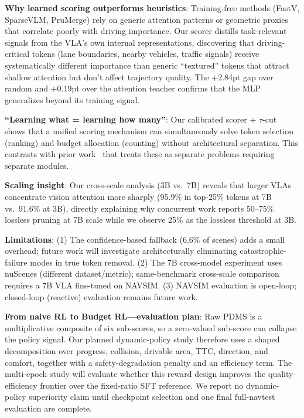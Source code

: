 \documentclass[letterpaper]{article} %
\begin{document}
\textbf{Why learned scoring outperforms heuristics}: Training-free methods (FastV, SparseVLM, PruMerge) rely on generic attention patterns or geometric proxies that correlate poorly with driving importance.
Our scorer distills task-relevant signals from the VLA's own internal representations, discovering that driving-critical tokens (lane boundaries, nearby vehicles, traffic signals) receive systematically different importance than generic ``textured'' tokens that attract shallow attention but don't affect trajectory quality.
The +2.84pt gap over random and +0.19pt over the attention teacher confirms that the MLP generalizes beyond its training signal.

\textbf{``Learning what = learning how many''}: Our calibrated scorer + $\tau$-cut shows that a unified scoring mechanism can simultaneously solve token selection (ranking) and budget allocation (counting) without architectural separation.
This contrasts with prior work~\citep{prune2drive2026,mvpruner2026} that treats these as separate problems requiring separate modules.

\textbf{Scaling insight}: Our cross-scale analysis (3B vs.\ 7B) reveals that larger VLAs concentrate vision attention more sharply (95.9\% in top-25\% tokens at 7B vs.\ 91.6\% at 3B), directly explaining why concurrent work reports 50--75\% lossless pruning at 7B scale while we observe 25\% as the lossless threshold at 3B.

\textbf{Limitations}:
(1) The confidence-based fallback (6.6\% of scenes) adds a small overhead; future work will investigate architecturally eliminating catastrophic-failure modes in true token removal.
(2) The 7B cross-model experiment uses nuScenes (different dataset/metric); same-benchmark cross-scale comparison requires a 7B VLA fine-tuned on NAVSIM.
(3) NAVSIM evaluation is open-loop; closed-loop (reactive) evaluation remains future work.

\textbf{From naive RL to Budget RL---evaluation plan}:
Raw PDMS is a multiplicative composite of six sub-scores, so a zero-valued sub-score can collapse the policy signal. Our planned dynamic-policy study therefore uses a shaped decomposition over progress, collision, drivable area, TTC, direction, and comfort, together with a safety-degradation penalty and an efficiency term.
The multi-epoch study will evaluate whether this reward design improves the quality--efficiency frontier over the fixed-ratio SFT reference. We report no dynamic-policy superiority claim until checkpoint selection and one final full-navtest evaluation are complete.
\end{document}
